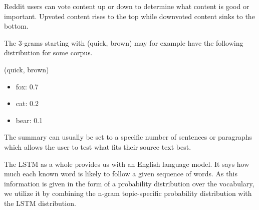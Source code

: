  Reddit users can vote content up or down to determine what content is good or important. Upvoted content rises to the top while downvoted content sinks to the bottom. 
 
 The 3-grams starting with (quick, brown) may for example have the following distribution for some corpus.

(quick, brown)
\begin{itemize}
\item fox: 0.7
\item cat: 0.2
\item bear: 0.1
\end{itemize}

The summary can usually be set to a specific number of sentences or paragraphs which allows the user to test what fits their source text best. 


The LSTM as a whole provides us with an English language model. It says how much each known word is likely to follow a given sequence of words. As this information is given in the form of a probability distribution over the vocabulary, we utilize it by combining the n-gram topic-specific probability distribution with the LSTM distribution.

\newsavebox\mybox
\savebox{}
\newwatermark*[
  allpages,
  angle=45,
  scale=6,
  xpos=-20,
  ypos=15
]{\usebox\mybox}